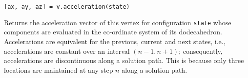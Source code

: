 \medskip\noindent
\texttt{[ax, ay, az] = v.acceleration(state)} 

\medskip\noindent 
Returns the acceleration vector of this vertex for configuration \texttt{state} whose components are evaluated in the co-ordinate system of its dodecahedron.  Accelerations are equivalent for the previous, current and next states, i.e., accelerations are constant over an interval $(n \! - \! 1, n \! + \! 1)$; consequently, accelerations are discontinuous along a solution path.  This is because only three locations are maintained at any step $n$ along a solution path.
